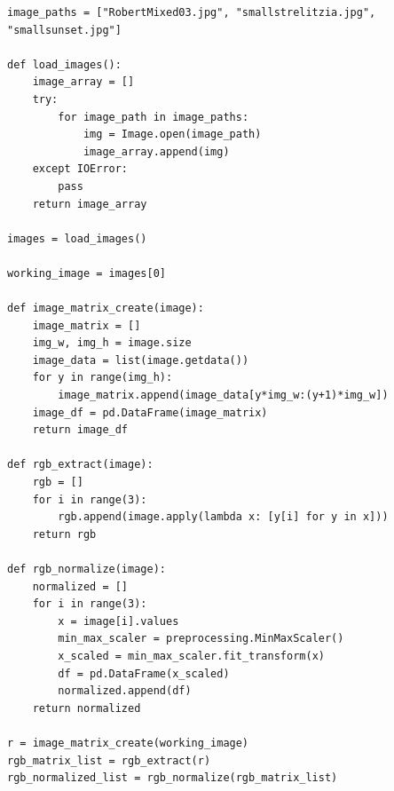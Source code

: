 \documentclass{article}      %
\begin{document}
\begin{lstlisting}
image_paths = ["RobertMixed03.jpg", "smallstrelitzia.jpg", "smallsunset.jpg"]

def load_images():
    image_array = []
    try:
        for image_path in image_paths:
            img = Image.open(image_path)
            image_array.append(img)
    except IOError: 
        pass
    return image_array

images = load_images()

working_image = images[0]

def image_matrix_create(image):
    image_matrix = []
    img_w, img_h = image.size
    image_data = list(image.getdata())
    for y in range(img_h):
        image_matrix.append(image_data[y*img_w:(y+1)*img_w])
    image_df = pd.DataFrame(image_matrix)
    return image_df

def rgb_extract(image):
    rgb = []
    for i in range(3):
        rgb.append(image.apply(lambda x: [y[i] for y in x]))
    return rgb

def rgb_normalize(image):
    normalized = []
    for i in range(3):
        x = image[i].values 
        min_max_scaler = preprocessing.MinMaxScaler()
        x_scaled = min_max_scaler.fit_transform(x)
        df = pd.DataFrame(x_scaled)
        normalized.append(df)
    return normalized

r = image_matrix_create(working_image)
rgb_matrix_list = rgb_extract(r)
rgb_normalized_list = rgb_normalize(rgb_matrix_list)
\end{lstlisting}
\end{document}
